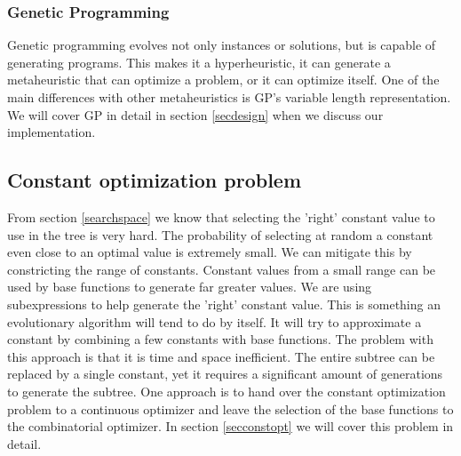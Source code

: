 \subsubsection{Genetic Programming}
Genetic programming \cite{GP} evolves not only instances or solutions, but is capable of generating programs. This makes it a hyperheuristic, it can generate a metaheuristic that can optimize a problem, or it can optimize itself. One of the main differences with  other metaheuristics is GP's variable length representation. 
We will cover GP in detail in section \ref{secdesign}  when we discuss our implementation.

\subsection{Constant optimization problem}
From section \ref{searchspace} we know that selecting the 'right' constant value to use in the tree is very hard. The probability of selecting at random a constant even close to an optimal value is extremely small. We can mitigate this by constricting the range of constants. Constant values from a small range can be used by base functions to generate far greater values. We are using subexpressions to help generate the 'right' constant value. This is something an evolutionary algorithm will tend to do by itself. It will try to approximate a constant by combining a few constants with base functions. The problem with this approach is that it is time and space inefficient. The entire subtree can be replaced by a single constant, yet it requires a significant amount of generations to generate the subtree. One approach is to hand over the constant optimization problem to a continuous optimizer and leave the selection of the base functions to the combinatorial optimizer. In section \ref{secconstopt} we will cover this problem in detail.


